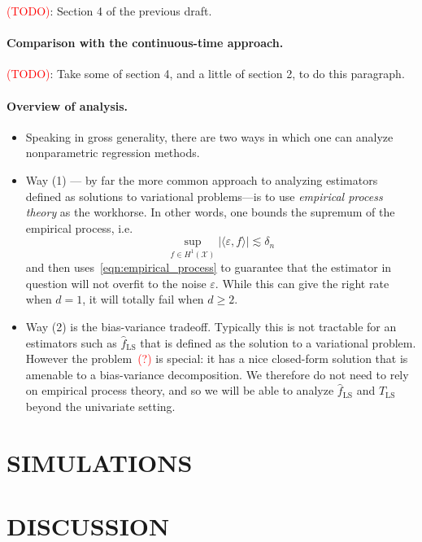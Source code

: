 \documentclass[twoside]{article}
\newcommand{\abs}[1]{\left \lvert #1 \right \rvert}
\newcommand{\1}{\mathbf{1}}
\newcommand{\Xset}{\mathcal{X}}
\newcommand{\wh}[1]{\widehat{#1}}
\newcommand{\LS}{\mathrm{LS}}
\theoremstyle{definition}
\theoremstyle{remark}
\begin{document}
\textcolor{red}{(TODO)}: Section 4 of the previous draft.

\paragraph{Comparison with the continuous-time approach.}

\textcolor{red}{(TODO)}: Take some of section 4, and a little of section 2, to do this paragraph.

\paragraph{Overview of analysis.}
\begin{itemize}
	\item Speaking in gross generality, there are two ways in which one can analyze nonparametric regression methods. 
	\item Way (1) --- by far the more common approach to analyzing estimators defined as solutions to variational problems---is to use \emph{empirical process theory} as the workhorse. In other words, one bounds the supremum of the empirical process, i.e.
	\begin{equation}
	\label{eqn:empirical_process}
	\sup_{f \in H^1(\Xset)} \abs{\langle \varepsilon, f \rangle} \lesssim \delta_n
	\end{equation}
	and then uses~\eqref{eqn:empirical_process} to guarantee that the estimator in question will not overfit to the noise $\varepsilon$. While this can give the right rate when $d = 1$, it will totally fail when $d \geq 2$. 
	\item Way (2) is the bias-variance tradeoff. Typically this is not tractable for an estimators such as $\wh{f}_{\LS}$ that is defined as the solution to a variational problem. However the problem~\textcolor{red}{(?)} is special: it has a nice closed-form solution that is amenable to a bias-variance decomposition. We therefore do not need to rely on empirical process theory, and so we will be able to analyze $\wh{f}_{\LS}$ and $T_{\LS}$ beyond the univariate setting.
\end{itemize}

\section{SIMULATIONS}
\label{sec:simulations}

\section{DISCUSSION}
\label{sec:discussion}


 
\end{document}
